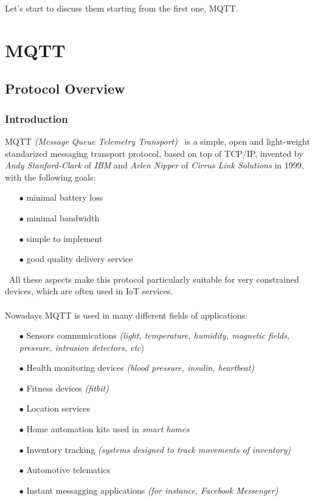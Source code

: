 \documentclass[12pt]{report}
\begin{document}
{\setlength{\parindent}{0cm}
Let's start to discuss them starting from the first one, MQTT.

\part{MQTT}

\chapter{Protocol Overview}

\section{Introduction}
\bigskip
\textsc{MQTT} \emph{(Message Queue Telemetry Transport)}~\cite{mqttrfc} is a simple, open and light-weight standarized messaging transport protocol, based on top of TCP/IP, invented by \emph{Andy Stanford-Clark} of \emph{IBM} and \emph{Arlen Nipper} of \emph{Cirrus Link Solutions}\cite{cirruslink} in 1999, with the following goals:


\begin{itemize}
\setlength{\itemindent}{+4mm}
  \item[$\bullet$] minimal battery loss
  \item[$\bullet$] minimal bandwidth
  \item[$\bullet$] simple to implement
  \item[$\bullet$] good quality delivery service
\end{itemize}\
All these aspects make this protocol particularly suitable for very constrained devices, which are often used in IoT services.\\\\
Nowadays MQTT is used in many different fields of applications:

 \begin{itemize}
 \setlength{\itemindent}{+4mm}
  \item[$\bullet$] Sensors communications \emph{(light, temperature, humidity, magnetic fields, pressure, intrusion detectors, etc})
  \item[$\bullet$] Health monitoring devices \emph{(blood pressure, insulin, heartbeat)}
  \item[$\bullet$] Fitness devices\emph{ (fitbit)}
  \item[$\bullet$] Location services
  \item[$\bullet$] Home automation kits used in \emph{smart homes}
  \item[$\bullet$] Inventory tracking \emph{(systems designed to track movements of inventory)}
  \item[$\bullet$] Automotive telematics
  \item[$\bullet$] Instant messagging applications \emph{(for instance, Facebook Messenger)}
\end{itemize}\

}
\end{document}
